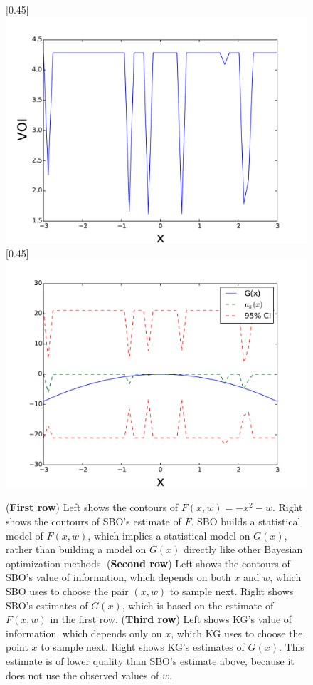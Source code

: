 \documentclass{article} %
\newcommand{\w}{w}
\begin{document}
\begin{figure}[tb]
  [0.45\linewidth]{
      \includegraphics[width=0.44\linewidth]{9prior10VoiStandardGaussianSeed100samples100.pdf}
  }
  \quad
  [0.45\linewidth]{
      \includegraphics[width=0.44\linewidth]{8prior10StandardGaussianSeed100samples100.pdf}
  }
\caption{
    ({\bf First row}) Left shows the contours of $F\left(x,\w\right)=-x^{2}-\w$.  Right shows the contours of SBO's estimate of $F$.  SBO builds a statistical model of $F(x,\w)$, which implies a statistical model on $G(x)$, rather than building a model on $G(x)$ directly like other Bayesian optimization methods.
    ({\bf Second row}) Left shows the contours of SBO's value of information, which depends on both $x$ and $\w$, which SBO uses to choose the pair $(x,\w)$ to sample next.  Right shows SBO's estimates of $G(x)$, which is based on the estimate of $F(x,\w)$ in the first row.
    ({\bf Third row}) Left shows KG's value of information, which depends only on $x$, which KG uses to choose the point $x$ to sample next.  Right shows KG's estimates of $G(x)$.  This estimate is of lower quality than SBO's estimate above, because it does not use the observed values of $\w$.
\label{fig:tahi10}}
\end{figure} 
\end{document}
